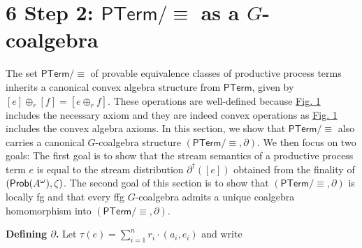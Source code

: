 \documentclass[11pt,a4paper]{amsart}
\begin{document}
%
\hypertarget{html:S6}{} %
\hypertarget{html:S6.m1}{}%
\hypertarget{html:S6.m2}{}\section*{6 Step 2: \({\mathsf{PTerm}/{\equiv}}\) as a \({G}\)-coalgebra}
\hypertarget{html:S6.p1}{} The set %
\hypertarget{html:S6.p1.m1}{}\({\mathsf{PTerm}/{\equiv}}\) of provable equivalence classes of productive process terms inherits a canonical convex algebra structure from %
\hypertarget{html:S6.p1.m2}{}\({\mathsf{PTerm}}\), given by %
\hypertarget{html:S6.p1.m3}{}\({[e]\oplus_{r}[f]=[e\oplus_{r}f]}\). These operations are well-defined because \hyperlink{html:S3.F1}{Fig. 1} includes the necessary axiom and they are indeed convex operations as \hyperlink{html:S3.F1}{Fig. 1} includes the convex algebra axioms. In this section, we show that %
\hypertarget{html:S6.p1.m4}{}\({\mathsf{PTerm}/{\equiv}}\) also carries a canonical %
\hypertarget{html:S6.p1.m5}{}\({G}\)-coalgebra structure %
\hypertarget{html:S6.p1.m6}{}\({(\mathsf{PTerm}/{\equiv},\partial)}\). We then focus on two goals: The first goal is to show that the stream semantics of a productive process term %
\hypertarget{html:S6.p1.m7}{}\({e}\) is equal to the stream distribution %
\hypertarget{html:S6.p1.m8}{}\({\partial^{\dagger}([e])}\) obtained from the finality of %
\hypertarget{html:S6.p1.m9}{}\({(\text{\sf Prob}(A^{\omega}),\zeta)}\). The second goal of this section is to show that %
\hypertarget{html:S6.p1.m10}{}\({(\mathsf{PTerm}/{\equiv},\partial)}\) is locally fg and that every ffg %
\hypertarget{html:S6.p1.m11}{}\({G}\)-coalgebra admits a unique coalgebra homomorphism into %
\hypertarget{html:S6.p1.m12}{}\({(\mathsf{PTerm}/{\equiv},\partial)}\).
\par\medskip
\hypertarget{html:S6.SS0.SSS0.P0.SPx1}{} \par\noindent\textbf{Defining %
\hypertarget{html:S6.SS0.SSS0.P0.SPx1.m1}{}\({\partial}\).}\quad  %
\hypertarget{html:S6.SS0.SSS0.P0.SPx1.p1}{} Let %
\hypertarget{html:S6.SS0.SSS0.P0.SPx1.p1.m1}{}\({\tau(e)=\sum_{i=1}^{n}r_{i}\cdot(a_{i},e_{i})}\) and write %
\end{document}
